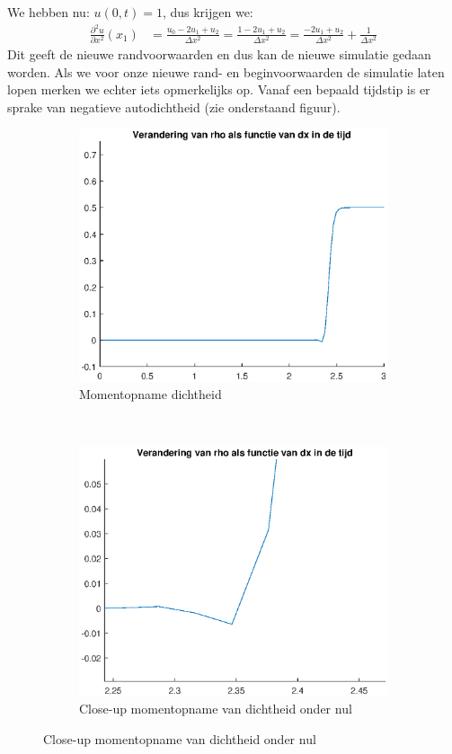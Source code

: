 \documentclass{article}
\begin{document}
We hebben nu: $u(0,t) = 1$, dus krijgen we:
\begin{align*}
\frac{\partial^2 u}{\partial x^2}(x_1) &= \frac{u_{0}-2u_1+u_{2}}{\Delta x^2}
= \frac{1-2u_1+u_{2}}{\Delta x^2}
= \frac{-2u_1+u_{2}}{\Delta x^2} +\frac{1}{\Delta x^2}
\end{align*}
Dit geeft de nieuwe randvoorwaarden en dus kan de nieuwe simulatie gedaan worden.
Als we voor onze nieuwe rand- en beginvoorwaarden de simulatie laten lopen merken we echter iets opmerkelijks op.
Vanaf een bepaald tijdstip is er sprake van negatieve autodichtheid (zie onderstaand figuur).
\begin{figure}[H]
\begin{subfigure}{0.45\textwidth}
\includegraphics[scale=0.5]{6gek.eps}
\caption{Momentopname dichtheid}
\end{subfigure}
~
\begin{subfigure}{0.45\textwidth}
\includegraphics[scale=0.5]{6gekc.eps}
\caption{Close-up momentopname van dichtheid onder nul}
\end{subfigure}
\end{figure}
\end{document}
